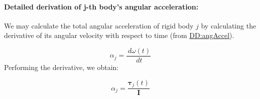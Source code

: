 \documentclass[12pt]{article}
\begin{document}
\paragraph{Detailed derivation of j-th body's angular acceleration:}
\label{IM:rotMotDeriv}
We may calculate the total angular acceleration of rigid body $j$ by calculating the derivative of its angular velocity with respect to time (from \hyperref[DD:angAccel]{DD:angAccel}).

\begin{displaymath}
{α_{j}}=\frac{\,dω\left(t\right)}{\,dt}
\end{displaymath}
Performing the derivative, we obtain:

\begin{displaymath}
{α_{j}}=\frac{{\symbf{τ}_{j}}\left(t\right)}{\symbf{I}}
\end{displaymath}
\medskip
\noindent
\end{document}

